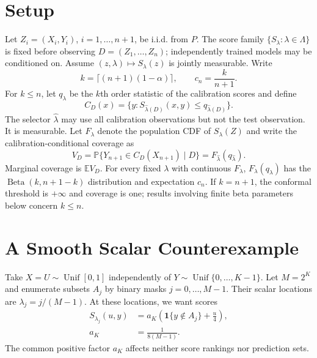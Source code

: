 \documentclass{article}
\newcommand{\PP}{\mathbb P}
\newcommand{\EE}{\mathbb E}
\newcommand{\ind}{\mathbf 1}
\begin{document}
\section{Setup}

Let $Z_i=(X_i,Y_i)$, $i=1,\ldots,n+1$, be i.i.d. from $P$. The score family $\{S_\lambda:\lambda\in\Lambda\}$ is fixed before observing $D=(Z_1,\ldots,Z_n)$; independently trained models may be conditioned on. Assume $(z,\lambda)\mapsto S_\lambda(z)$ is jointly measurable. Write
\begin{equation}
 k=\lceil(n+1)(1-\alpha)\rceil,\qquad c_n=\frac{k}{n+1}.
\end{equation}
For $k\le n$, let $q_\lambda$ be the $k$th order statistic of the calibration scores and define
\begin{equation}
 C_D(x)=\{y:S_{\hat\lambda(D)}(x,y)\le q_{\hat\lambda(D)}\}.
\end{equation}
The selector $\hat\lambda$ may use all calibration observations but not the test observation. It is measurable. Let $F_\lambda$ denote the population CDF of $S_\lambda(Z)$ and write the calibration-conditional coverage as
\begin{equation}\label{eq:conditional}
 V_D=\PP\{Y_{n+1}\in C_D(X_{n+1})\mid D\}
     =F_{\hat\lambda}(q_{\hat\lambda}).
\end{equation}
Marginal coverage is $\EE V_D$. For every fixed $\lambda$ with continuous $F_\lambda$, $F_\lambda(q_\lambda)$ has the $\operatorname{Beta}(k,n+1-k)$ distribution and expectation $c_n$. If $k=n+1$, the conformal threshold is $+\infty$ and coverage is one; results involving finite beta parameters below concern $k\le n$.

\section{A Smooth Scalar Counterexample}

Take $X=U\sim\operatorname{Unif}[0,1]$ independently of $Y\sim\operatorname{Unif}\{0,\ldots,K-1\}$. Let $M=2^K$ and enumerate subsets $A_j$ by binary masks $j=0,\ldots,M-1$. Their scalar locations are $\lambda_j=j/(M-1)$. At these locations, we want scores
\begin{equation}\label{eq:knots}
 \begin{aligned}
 S_{\lambda_j}(u,y)&=a_K\left(\ind\{y\notin A_j\}+\frac{u}{4}\right),\\
 a_K&=\frac{1}{8(M-1)}.
 \end{aligned}
\end{equation}
The common positive factor $a_K$ affects neither score rankings nor prediction sets.
\end{document}

